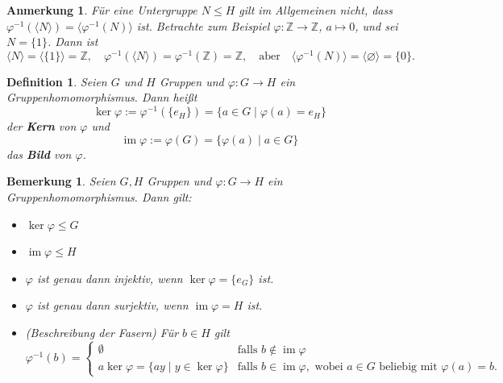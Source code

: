 \documentclass[a4paper, twoside, 11pt, ngerman]{report}
\newcommand{\ZZ}{\mathds Z}
\DeclareMathOperator{\image}{im}
\theoremstyle{definistyle}
\newtheorem{defini}[satz]{Definition}
\newtheorem{bem}[satz]{Bemerkung}
\newtheorem{anm}[satz]{Anmerkung}
\theoremstyle{remark}
\newcommand{\defn}[1]{\textit{\bfseries #1}}
\begin{document}
\begin{anm}\label{anm:untergruppen_von_bildern}
Für eine Untergruppe $N \leq H$ gilt im Allgemeinen nicht, dass $\varphi^{-1}(\langle N \rangle) = \langle \varphi^{-1}(N) \rangle$ ist. Betrachte zum Beispiel $\varphi: \mathbb{Z} \to \mathbb{Z}$, $a \mapsto 0$, und sei $N = \{1\}$. Dann ist
\[
\langle N \rangle = \langle \{1\} \rangle = \mathbb{Z}, \quad \varphi^{-1}(\langle N \rangle) = \varphi^{-1}(\ZZ)=\mathbb{Z}, \quad \text{aber} \quad \langle \varphi^{-1}(N) \rangle = \langle \varnothing \rangle = \{0\}.
\]
\end{anm}

\begin{defini}\label{def:kern_und_bild}
Seien $G$ und $H$ Gruppen und $\varphi: G \to H$ ein Gruppenhomomorphismus. Dann heißt
\[
\ker \varphi := \varphi^{-1}(\{e_H\}) = \{ a \in G \mid \varphi(a) = e_H \}
\]
der \defn{Kern} von $\varphi$ und
\[
\image \varphi := \varphi(G) = \{ \varphi(a) \mid a \in G \}
\]
das \defn{Bild} von $\varphi$.
\end{defini}

\begin{bem}\label{bem:kern_und_bild_eigenschaften}
Seien $G, H$ Gruppen und $\varphi \colon G \to H$ ein Gruppenhomomorphismus. Dann gilt:
\begin{itemize}
    \item[(a)] $\ker \varphi \leq G$
    \item[(b)] $\image \varphi \leq H$
    \item[(c)] $\varphi$ ist genau dann injektiv, wenn $\ker \varphi = \{e_G\}$ ist.
    \item[(d)] $\varphi$ ist genau dann surjektiv, wenn $\image \varphi = H$ ist.
    \item[(e)] (Beschreibung der Fasern) Für $b \in H$ gilt
    \[
    \varphi^{-1}(b) = 
    \begin{cases}
      \emptyset & \text{falls } b \notin \image \varphi \\
      a \ker \varphi = \{ay \mid y \in \ker \varphi \} & \text{falls } b \in \image \varphi, \text{ wobei } a \in G \text{ beliebig mit } \varphi(a) = b.
    \end{cases}
    \]
\end{itemize}
\end{bem}
\end{document}
